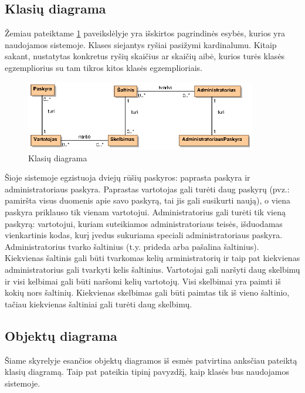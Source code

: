 \documentclass[12pt]{article}
\begin{document}
	\subsection{Klasių diagrama}
	
	Žemiau pateiktame \ref{ClassDiagram} paveikslėlyje yra išskirtos pagrindinės esybės, kurios yra naudojamos sistemoje. Klases siejantys ryšiai pasižymi kardinalumu. Kitaip sakant, nustatytas konkretus ryšių skaičius ar skaičių aibė, kurios turės klasės egzempliorius su tam tikros kitos klasės egzemplioriais.
	
	\begin{figure}[h]
		\begin{center}
			\includegraphics[width=0.9\textwidth]{KlasiuDiagrama.eps}
			\caption{Klasių diagrama\label{ClassDiagram}}
		\end{center}
	\end{figure}
	
	Šioje sistemoje egzistuoja dviejų rūšių paskyros: paprasta paskyra ir administratoriaus paskyra. Paprastas vartotojas gali turėti daug paskyrų (pvz.: pamiršta visus duomenis apie savo paskyrą, tai jis gali susikurti naują), o viena paskyra priklauso tik vienam vartotojui. Administratorius gali turėti tik vieną paskyrą: vartotojui, kuriam suteikiamos administratoriaus teisės, išduodamas vienkartinis kodas, kurį įvedus sukuriama speciali administratoriaus paskyra. Administratorius tvarko šaltinius (t.y. prideda arba pašalina šaltinius). Kiekvienas šaltinis gali būti tvarkomas kelių arministratorių ir taip pat kiekvienas administratorius gali tvarkyti kelis šaltinius. Vartotojai gali naršyti daug skelbimų ir visi kelbimai gali būti naršomi kelių vartotojų. Visi skelbimai yra paimti iš kokių nors šaltinių. Kiekvienas skelbimas gali būti paimtas tik iš vieno šaltinio, tačiau kiekvienas šaltiniai gali turėti daug skelbimų.
	\pagebreak
	
	\subsection{Objektų diagrama}
	
	Šiame skyrelyje esančios objektų diagramos iš esmės patvirtina anksčiau pateiktą klasių diagramą. Taip pat pateikia tipinį pavyzdžį, kaip klasės bus naudojamos sistemoje.
	
\end{document}
